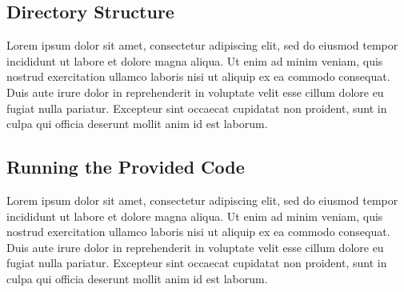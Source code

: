 \documentclass[twoside,12pt,a4paper]{article}
\begin{document}
\subsection{Directory Structure}
Lorem ipsum dolor sit amet, consectetur adipiscing elit, sed do eiusmod tempor incididunt ut labore et dolore magna aliqua. Ut enim ad minim veniam, quis nostrud exercitation ullamco laboris nisi ut aliquip ex ea commodo consequat. Duis aute irure dolor in reprehenderit in voluptate velit esse cillum dolore eu fugiat nulla pariatur. Excepteur sint occaecat cupidatat non proident, sunt in culpa qui officia deserunt mollit anim id est laborum.

\subsection{Running the Provided Code}
Lorem ipsum dolor sit amet, consectetur adipiscing elit, sed do eiusmod tempor incididunt ut labore et dolore magna aliqua. Ut enim ad minim veniam, quis nostrud exercitation ullamco laboris nisi ut aliquip ex ea commodo consequat. Duis aute irure dolor in reprehenderit in voluptate velit esse cillum dolore eu fugiat nulla pariatur. Excepteur sint occaecat cupidatat non proident, sunt in culpa qui officia deserunt mollit anim id est laborum.

\clearpage
\end{document}
